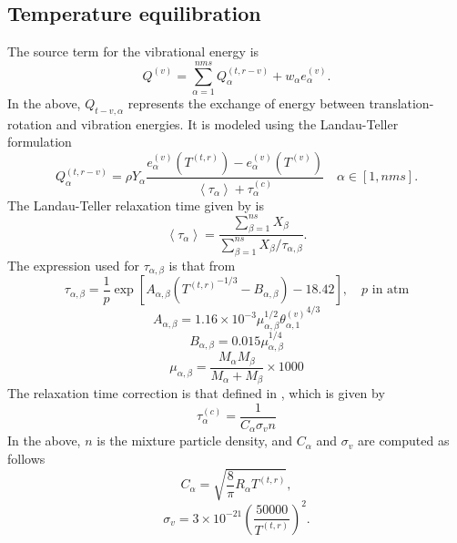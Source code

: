 \documentclass[oneside,a4paper,11pt]{report}
\begin{document}
\subsection{Temperature equilibration}
The source term for the vibrational energy is 
\begin{equation}
Q^{(v)} = \sum_{\alpha = 1}^{nms} Q^{(t,r-v)}_\alpha + w_\alpha e^{(v)}_\alpha.
\end{equation}
In the above, $Q_{t-v,\alpha}$ represents the exchange of energy between translation-rotation and vibration energies. It is modeled using the Landau-Teller formulation
\begin{equation}
Q^{(t,r-v)}_\alpha = \rho Y_\alpha \frac{ e^{(v)}_\alpha (T^{(t,r)}) - e^{(v)}_\alpha(T^{(v)}) }{ \left < \tau_\alpha \right > + \tau^{(c)}_\alpha } \quad \alpha \in [1,nms]. 
\end{equation}
The Landau-Teller relaxation time given by \cite{lee1985} is
\begin{equation}
\left < \tau_\alpha \right > = \frac{ \sum_{\beta = 1}^{ns} X_\beta}{ \sum_{\beta = 1}^{ns} X_\beta / \tau_{\alpha,\beta}}.
\end{equation}
The expression used for $\tau_{\alpha,\beta}$ is that from \cite{millikan1963}
\begin{equation}
\tau_{\alpha,\beta} = \frac{1}{p} \exp \left [ A_{\alpha,\beta} \left ( \left. T^{(t,r)} \right .^{-1/3} - B_{\alpha,\beta} \right ) - 18.42 \right ], \quad p \text{ in atm}
\end{equation}
\begin{equation}
A_{\alpha,\beta} = 1.16 \times 10^{-3} \mu_{\alpha,\beta}^{1/2} \left .\theta_{\alpha,1}^{(v)} \right.^{4/3}
\end{equation}
\begin{equation}
B_{\alpha,\beta} = 0.015 \mu_{\alpha,\beta}^{1/4}
\end{equation}
\begin{equation}
\mu_{\alpha,\beta} = \frac{M_{\alpha} M_{\beta}}{ M_\alpha + M_\beta} \times 1000
\end{equation}
The relaxation time correction is that defined in \cite{park1990}, which is given by
\begin{equation}
\tau^{(c)}_\alpha = \frac{1}{C_\alpha \sigma_v n}
\end{equation}
In the above, $n$ is the mixture particle density, and $C_\alpha$ and $\sigma_v$ are computed as follows
\begin{equation}
C_\alpha = \sqrt{ \frac{8}{\pi} R_\alpha T^{(t,r)}},
\end{equation}
\begin{equation}
\sigma_v = 3 \times 10^{-21} \left ( \frac{50000}{T^{(t,r)}} \right )^2.
\end{equation}
\end{document}
